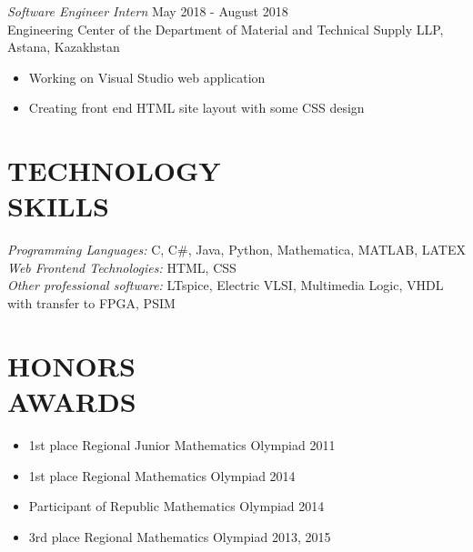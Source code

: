 \documentclass[margin, 10pt]{res} %
\begin{document}
\begin{resume}
{\sl Software Engineer Intern} \hfill May 2018 - August 2018 \\
Engineering Center of the Department of Material and Technical Supply LLP, Astana, Kazakhstan
\begin{itemize}
\item Working on Visual Studio web application
\item Creating front end HTML site layout with some CSS design
\end{itemize} 


\section{TECHNOLOGY \\ SKILLS} 

{\sl Programming Languages:} C, C\#, Java, Python, Mathematica, MATLAB, LATEX \\
{\sl Web Frontend Technologies:} HTML, CSS  \\
{\sl Other professional software:}   LTspice, Electric VLSI, Multimedia Logic, VHDL with transfer to FPGA, PSIM
 

\section{HONORS \\ AWARDS}
\begin{itemize}
\item 1st place Regional Junior Mathematics Olympiad \hfill 2011 
\item 1st place Regional Mathematics Olympiad  \hfill 2014 
\item Participant of Republic Mathematics Olympiad \hfill 2014 
\item 3rd place Regional Mathematics Olympiad \hfill 2013, 2015 



\end{itemize}



\end{resume}
\end{document}
